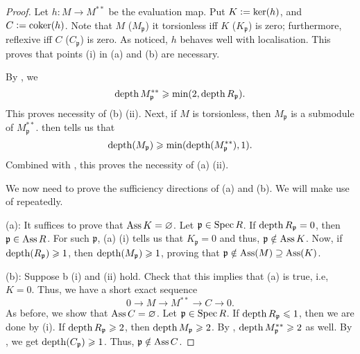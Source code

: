 \documentclass[12pt]{article}
\begin{document}
\begin{proof} 
	Let $h : M \to M^{\ast \ast}$ be the evaluation map. Put $K \vcentcolon= \ker(h)$, and $C \vcentcolon= \operatorname{coker}(h)$. Note that $M$ ($M_{\mathfrak{p}}$) it torsionless iff $K$ ($K_{\mathfrak{p}}$) is zero; furthermore, reflexive iff $C$ ($C_{\mathfrak{p}}$) is zero. As noticed, $h$ behaves well with localisation. This proves that points (i) in (a) and (b) are necessary. 

	By , we 
	\begin{equation} \label{eq:010}
		\operatorname{depth} M_{\mathfrak{p}}^{\ast \ast} \geqslant \min(2, \operatorname{depth} R_{\mathfrak{p}}).
	\end{equation}
	This proves necessity of (b) (ii). Next, if $M$ is torsionless, then $M_{\mathfrak{p}}$ is a submodule of $M_{\mathfrak{p}}^{\ast \ast}$.  then tells us that
	\begin{equation*} 
		\operatorname{depth}(M_{\mathfrak{p}}) \geqslant \min(\operatorname{depth}(M_{\mathfrak{p}}^{\ast \ast}), 1).
	\end{equation*}
	Combined with , this proves the necessity of (a) (ii).

	We now need to prove the sufficiency directions of (a) and (b). We will make use of  repeatedly.

	(a): It suffices to prove that $\operatorname{Ass} K = \varnothing$. Let $\mathfrak{p} \in \operatorname{Spec} R$. If $\operatorname{depth} R_{\mathfrak{p}} = 0$, then $\mathfrak{p} \in \operatorname{Ass} R$. For such $\mathfrak{p}$, (a) (i) tells us that $K_{\mathfrak{p}} = 0$ and thus, $\mathfrak{p} \notin \operatorname{Ass} K$. \newline
	Now, if $\operatorname{depth}(R_{\mathfrak{p}}) \geqslant 1$, then $\operatorname{depth}(M_{\mathfrak{p}}) \geqslant 1$, proving that $\mathfrak{p} \notin \operatorname{Ass}(M) \supseteq \operatorname{Ass}(K)$.

	(b): Suppose b (i) and (ii) hold. Check that this implies that (a) is true, i.e, $K = 0$. Thus, we have a short exact sequence
	\begin{equation*} 
		0 \to M \to M^{\ast \ast} \to C \to 0.
	\end{equation*} 
	As before, we show that $\operatorname{Ass} C = \varnothing$. \newline
	Let $\mathfrak{p} \in \operatorname{Spec} R$. If $\operatorname{depth} R_{\mathfrak{p}} \leqslant 1$, then we are done by (i). If $\operatorname{depth} R_{\mathfrak{p}} \geqslant 2$, then $\operatorname{depth} M_{\mathfrak{p}} \geqslant 2$. By , $\operatorname{depth} M_{\mathfrak{p}}^{\ast \ast} \geqslant 2$ as well. By , we get $\operatorname{depth}(C_{\mathfrak{p}}) \geqslant 1$. Thus, $\mathfrak{p} \notin \operatorname{Ass} C$.
\end{proof}
\end{document}
